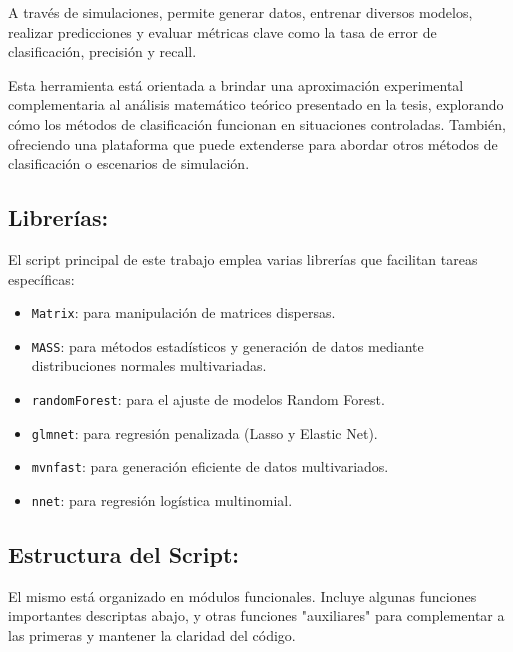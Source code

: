 \documentclass{report}
\begin{document}
A través de simulaciones, permite generar datos, entrenar diversos modelos, realizar predicciones y evaluar métricas clave como la tasa de error de clasificación, precisión y recall. 

Esta herramienta está orientada a brindar una aproximación experimental complementaria al análisis matemático teórico presentado en la tesis, explorando cómo los métodos de clasificación funcionan en situaciones controladas. También, ofreciendo una plataforma que puede extenderse para abordar otros métodos de clasificación o escenarios de simulación.

\subsection*{Librerías:}

El script principal de este trabajo emplea varias librerías que facilitan tareas específicas:

\begin{itemize}
	\item \texttt{Matrix}: para manipulación de matrices dispersas.
	
	\item \texttt{MASS}: para métodos estadísticos y generación de datos mediante distribuciones normales multivariadas.
	
	\item \texttt{randomForest}: para el ajuste de modelos Random Forest.
	
	\item \texttt{glmnet}: para regresión penalizada (Lasso y Elastic Net).
	
	\item \texttt{mvnfast}: para generación eficiente de datos multivariados.
	
	\item \texttt{nnet}: para regresión logística multinomial.
\end{itemize}

\subsection*{Estructura del Script:} 

El mismo está organizado en módulos funcionales. Incluye algunas funciones importantes descriptas abajo, y otras funciones "auxiliares" para complementar a las primeras y mantener la claridad del código. 
\end{document}
